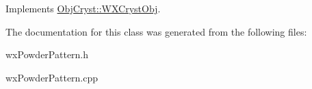 Implements \mbox{\hyperlink{class_obj_cryst_1_1_w_x_cryst_obj_a3736357599263df7e550790753c040a3}{Obj\+Cryst\+::\+W\+X\+Cryst\+Obj}}.



The documentation for this class was generated from the following files\+:\begin{DoxyCompactItemize}
\item 
wx\+Powder\+Pattern.\+h\item 
wx\+Powder\+Pattern.\+cpp\end{DoxyCompactItemize}
